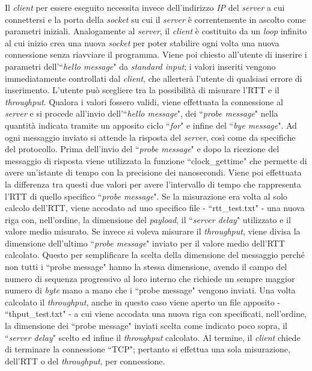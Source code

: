 \documentclass[a4paper, 12pt]{report}
\begin{document}
Il \textit{client} per essere eseguito necessita invece dell'indirizzo \textit{IP} del \textit{server} a cui connettersi e la porta della
\textit{socket} su cui il \textit{server} è correntemente in ascolto come parametri iniziali.\newline
Analogamente al \textit{server}, il \textit{client} è costituito da un \textit{loop} infinito al cui inizio crea una nuova \textit{socket} per poter 
stabilire ogni volta una nuova connessione senza riavviare il programma. Viene poi chiesto all'utente di inserire i parametri dell'``\textit{hello 
message}" da \textit{standard input}; i valori inseriti vengono immediatamente controllati dal \textit{client}, che allerterà l'utente di qualsiasi
errore di inserimento. L'utente può scegliere tra la possibilità di misurare l'RTT e il \textit{throughput}. Qualora i valori fossero validi,
viene effettuata la connessione al \textit{server} e si procede all'invio dell'``\textit{hello message}", dei ``\textit{probe message}" nella
quantità indicata tramite un apposito ciclo ``\textit{for}" e infine del ``\textit{bye message}". Ad ogni messaggio inviato si attende la risposta
del \textit{server}, così come da specifiche del protocollo.\newline
Prima dell'invio del ``\textit{probe message}" e dopo la ricezione del messaggio di risposta viene utilizzata la funzione ``clock\_gettime" che
permette di avere un'istante di tempo con la precisione dei nanosecondi. Viene poi effettuata la differenza tra questi due valori per avere
l'intervallo di tempo che rappresenta l'RTT di quello specifico ``\textit{probe message}". Se la misurazione era volta al solo calcolo
dell'RTT, viene accodato ad uno specifico file - ``rtt\_test.txt" - una nuova riga con, nell'ordine, la dimensione del \textit{payload}, 
il ``\textit{server delay}" utilizzato e il valore medio misurato.\newline
Se invece si voleva misurare il \textit{throughput}, viene divisa la dimensione dell'ultimo ``\textit{probe message}" inviato
per il valore medio dell'RTT calcolato. Questo per semplificare la scelta della dimensione del messaggio perché non tutti i ``probe
message" hanno la stessa dimensione, avendo il campo del numero di sequenza progressivo al loro interno che richiede un sempre maggior numero di 
\textit{byte} mano a mano che i ``probe message" vengono inviati. Una volta calcolato il \textit{throughput}, anche in questo caso viene aperto un
file apposito - ``thput\_test.txt" - a cui viene accodata una nuova riga con specificati, nell'ordine, la dimensione dei ``probe message" inviati
scelta come indicato poco sopra, il ``\textit{server delay}" scelto ed infine il \textit{throughput} calcolato.
Al termine, il \textit{client} chiede di terminare la connessione ``TCP"; pertanto si effettua una sola misurazione, dell'RTT o del 
\textit{throughput}, per connessione.
\end{document}
